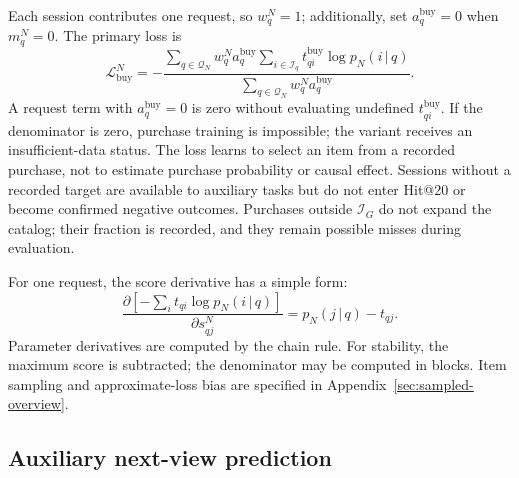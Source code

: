 \documentclass[12pt,a4paper]{article}
\newcommand{\given}{\,\vert\,}
\theoremstyle{plainru}
\begin{document}
Each session contributes one request, so $w_q^N=1$;
additionally, set $a_q^{\mathrm{buy}}=0$ when $m_q^N=0$.
The primary loss is
\begin{equation}\label{eq:modern-buy-loss}
\mathcal L_{\mathrm{buy}}^N=
-\frac{\displaystyle\sum_{q\in\mathcal Q_N}w_q^Na_q^{\mathrm{buy}}
\sum_{i\in\mathcal I_q}t_{qi}^{\mathrm{buy}}\log p_N(i\given q)}
{\displaystyle\sum_{q\in\mathcal Q_N}w_q^Na_q^{\mathrm{buy}}}.
\end{equation}
A request term with $a_q^{\mathrm{buy}}=0$ is zero without
evaluating undefined $t_{qi}^{\mathrm{buy}}$.
If the denominator is zero, purchase training is impossible;
the variant receives an insufficient-data status.
The loss learns to select an item from a recorded purchase, not to estimate
purchase probability or causal effect. Sessions without a recorded
target are available to auxiliary tasks but do not enter Hit@20 or become
confirmed negative outcomes.
Purchases outside $\mathcal I_G$ do not expand the catalog; their fraction is recorded,
and they remain possible misses during evaluation.

For one request, the score derivative has a simple form:
\begin{equation}\label{eq:modern-softmax-gradient}
\frac{\partial\left[-\sum_i t_{qi}\log p_N(i\given q)\right]}
{\partial s_{qj}^{N}}=p_N(j\given q)-t_{qj}.
\end{equation}
Parameter derivatives are computed by the chain rule.
For stability, the maximum score is subtracted; the denominator may
be computed in blocks. Item sampling and approximate-loss bias
are specified in Appendix~\ref{sec:sampled-overview}.

\subsection{Auxiliary next-view prediction}
\label{sec:modern-next}
\end{document}

